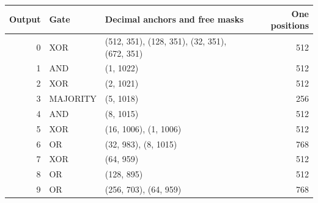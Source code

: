 \begin{tabular}{rlp{8cm}r}
\toprule
Output & Gate & Decimal anchors and free masks & One positions \\
\midrule
0 & XOR & (512, 351), (128, 351), (32, 351), (672, 351) & 512 \\
1 & AND & (1, 1022) & 512 \\
2 & XOR & (2, 1021) & 512 \\
3 & MAJORITY & (5, 1018) & 256 \\
4 & AND & (8, 1015) & 512 \\
5 & XOR & (16, 1006), (1, 1006) & 512 \\
6 & OR & (32, 983), (8, 1015) & 768 \\
7 & XOR & (64, 959) & 512 \\
8 & OR & (128, 895) & 512 \\
9 & OR & (256, 703), (64, 959) & 768 \\
\bottomrule
\end{tabular}
